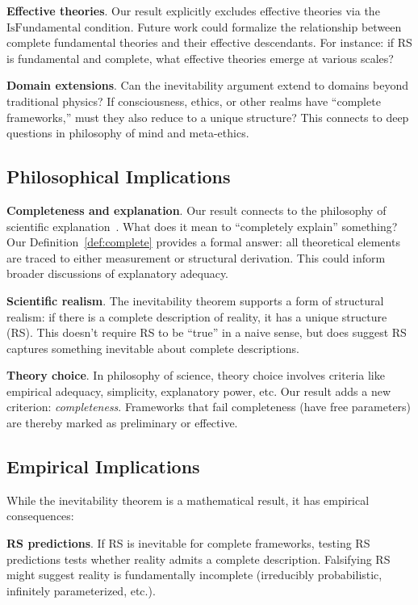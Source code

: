 \documentclass[12pt]{article}
\theoremstyle{remark}
\begin{document}
\textbf{Effective theories}. Our result explicitly excludes effective theories via the $\mathrm{IsFundamental}$ condition. Future work could formalize the relationship between complete fundamental theories and their effective descendants. For instance: if RS is fundamental and complete, what effective theories emerge at various scales?

\textbf{Domain extensions}. Can the inevitability argument extend to domains beyond traditional physics? If consciousness, ethics, or other realms have ``complete frameworks,'' must they also reduce to a unique structure? This connects to deep questions in philosophy of mind and meta-ethics.

\subsection{Philosophical Implications}

\textbf{Completeness and explanation}. Our result connects to the philosophy of scientific explanation~\cite{Salmon1989,Woodward2003}. What does it mean to ``completely explain'' something? Our Definition~\ref{def:complete} provides a formal answer: all theoretical elements are traced to either measurement or structural derivation. This could inform broader discussions of explanatory adequacy.

\textbf{Scientific realism}. The inevitability theorem supports a form of structural realism: if there is a complete description of reality, it has a unique structure (RS). This doesn't require RS to be ``true'' in a naive sense, but does suggest RS captures something inevitable about complete descriptions.

\textbf{Theory choice}. In philosophy of science, theory choice involves criteria like empirical adequacy, simplicity, explanatory power, etc. Our result adds a new criterion: \emph{completeness}. Frameworks that fail completeness (have free parameters) are thereby marked as preliminary or effective.

\subsection{Empirical Implications}

While the inevitability theorem is a mathematical result, it has empirical consequences:

\textbf{RS predictions}. If RS is inevitable for complete frameworks, testing RS predictions tests whether reality admits a complete description. Falsifying RS might suggest reality is fundamentally incomplete (irreducibly probabilistic, infinitely parameterized, etc.).
\end{document}
